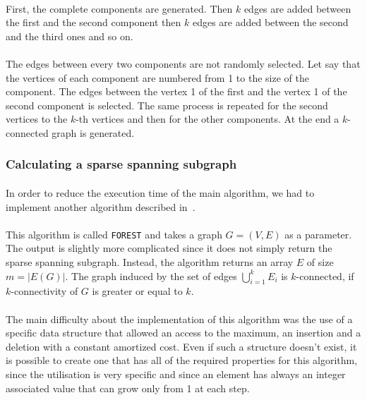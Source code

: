 \paragraph{}
First, the complete components are generated. Then $k$ edges are added between the 
first and the second component then $k$ edges are added between the second and the 
third ones and so on.

\paragraph{}
The edges between every two components are not randomly selected. Let say that the
vertices of each component are numbered from 1 to the size of the component.
The edges between the vertex 1 of the first and the vertex 1 of the second 
component is selected. The same process is repeated for the second vertices to the
$k$-th vertices and then  for the other components. At the end a $k$-connected 
graph is generated.


 
\subsubsection{Calculating a sparse spanning subgraph}
\paragraph{}
In order to reduce the execution time of the main algorithm, we had to
implement another algorithm described in~\cite{NaIb92}.

\paragraph{}
This algorithm is called \verb!FOREST! and takes a graph $G=(V,E)$ as a parameter.
The output is slightly more complicated since it does not simply return the
sparse spanning subgraph. Instead, the algorithm returns an array $E$ of size
$m = |E(G)|$. The graph induced by the set of edges $\bigcup \limits_{i=1}^k E_i$
is $k$-connected, if $k$-connectivity of $G$ is greater or equal to $k$.

\paragraph{}
The main difficulty about the implementation of this algorithm was the use of a
specific data structure that allowed an access to the maximum, an insertion and
a deletion with a constant amortized cost. Even if such a structure doesn't
exist, it is possible to create one that has all of the required properties for
this algorithm, since the utilisation is very specific and since an element has
always an integer associated value that can grow only from 1 at each step.

